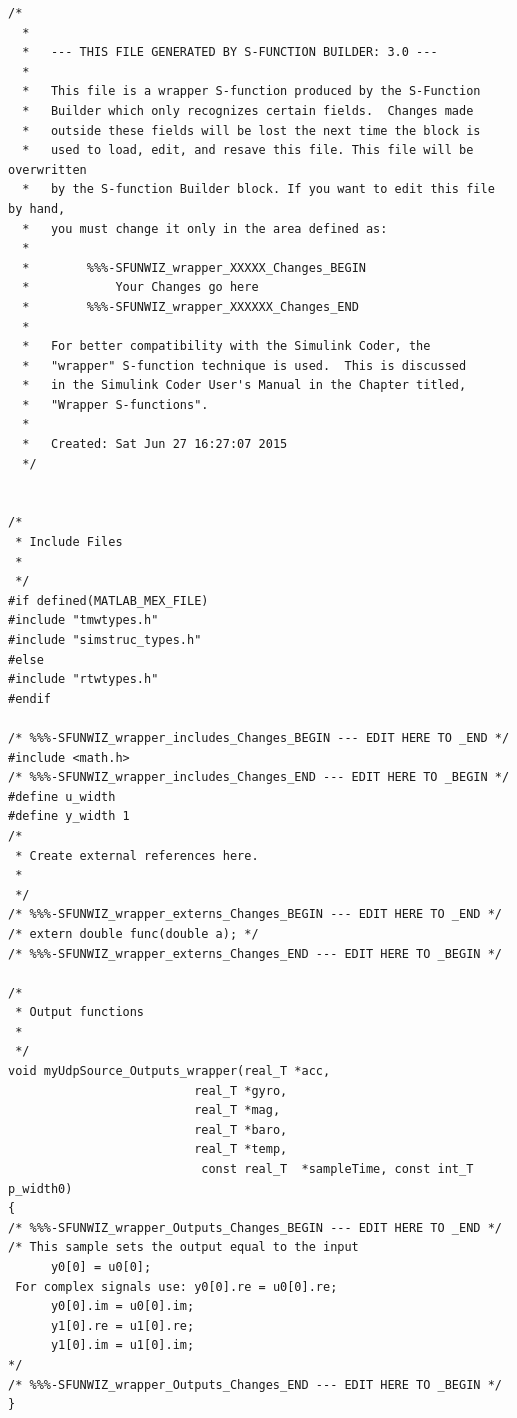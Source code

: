 \begin{lstlisting}[caption={[C-Code 'myUdpSource\_wrapper.c' generated by S-Function Builder]Complete C-Code template file 'myUdpSource\_wrapper.c' generated by the S-Function Builder according to the example shown in chapter \ref{sec:udpMatlab:simulinkBlock:builder}},label=code:c-sFunc-Code:rawTemplateWrapper]
/*
  *
  *   --- THIS FILE GENERATED BY S-FUNCTION BUILDER: 3.0 ---
  *
  *   This file is a wrapper S-function produced by the S-Function
  *   Builder which only recognizes certain fields.  Changes made
  *   outside these fields will be lost the next time the block is
  *   used to load, edit, and resave this file. This file will be overwritten
  *   by the S-function Builder block. If you want to edit this file by hand, 
  *   you must change it only in the area defined as:  
  *
  *        %%%-SFUNWIZ_wrapper_XXXXX_Changes_BEGIN 
  *            Your Changes go here
  *        %%%-SFUNWIZ_wrapper_XXXXXX_Changes_END
  *
  *   For better compatibility with the Simulink Coder, the
  *   "wrapper" S-function technique is used.  This is discussed
  *   in the Simulink Coder User's Manual in the Chapter titled,
  *   "Wrapper S-functions".
  *
  *   Created: Sat Jun 27 16:27:07 2015
  */


/*
 * Include Files
 *
 */
#if defined(MATLAB_MEX_FILE)
#include "tmwtypes.h"
#include "simstruc_types.h"
#else
#include "rtwtypes.h"
#endif

/* %%%-SFUNWIZ_wrapper_includes_Changes_BEGIN --- EDIT HERE TO _END */
#include <math.h>
/* %%%-SFUNWIZ_wrapper_includes_Changes_END --- EDIT HERE TO _BEGIN */
#define u_width 
#define y_width 1
/*
 * Create external references here.  
 *
 */
/* %%%-SFUNWIZ_wrapper_externs_Changes_BEGIN --- EDIT HERE TO _END */
/* extern double func(double a); */
/* %%%-SFUNWIZ_wrapper_externs_Changes_END --- EDIT HERE TO _BEGIN */

/*
 * Output functions
 *
 */
void myUdpSource_Outputs_wrapper(real_T *acc,
                          real_T *gyro,
                          real_T *mag,
                          real_T *baro,
                          real_T *temp, 
                           const real_T  *sampleTime, const int_T p_width0)
{
/* %%%-SFUNWIZ_wrapper_Outputs_Changes_BEGIN --- EDIT HERE TO _END */
/* This sample sets the output equal to the input
      y0[0] = u0[0]; 
 For complex signals use: y0[0].re = u0[0].re; 
      y0[0].im = u0[0].im;
      y1[0].re = u1[0].re;
      y1[0].im = u1[0].im;
*/
/* %%%-SFUNWIZ_wrapper_Outputs_Changes_END --- EDIT HERE TO _BEGIN */
}
\end{lstlisting}

